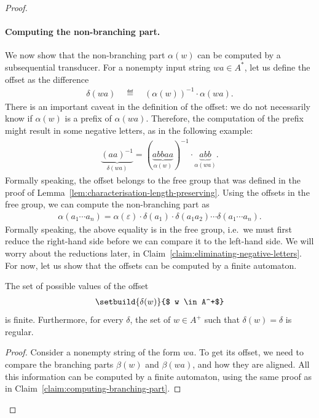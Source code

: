 \begin{proof}
\paragraph*{Computing the non-branching part.} We now show that the non-branching part $\alpha(w)$ can be computed by a subsequential transducer.  For a nonempty input string $wa \in A^*$, let us define the offset as the difference
\begin{align*}
\delta(wa) \quad \eqdef \quad     (\alpha(w))^{-1} \cdot \alpha(wa).
\end{align*}
There is an important caveat in the definition of the offset: we do not  necessarily know if $\alpha(w)$ is a prefix of $\alpha(wa)$. Therefore, the computation of the prefix might result in some negative letters, as in the following example:
\begin{align*}
 \underbrace{(aa)^{-1}}_{\delta(wa)}  = (\underbrace{abbaa}_{\alpha(w)})^{-1} \cdot \underbrace{abb}_{\alpha(wa)}.
\end{align*}
Formally speaking, the offset belongs to the {free group} that was defined in the proof of Lemma~\ref{lem:characterisation-length-preserving}. Using the offsets in the free group, we can compute the non-branching part as 
\begin{align}\label{eq:non-branching-part-deltas}
\alpha(a_1 \cdots a_n) = \alpha(\varepsilon) \cdot \delta(a_1) \cdot \delta(a_1 a_2) \cdots \delta(a_1 \cdots a_n).
\end{align}
Formally speaking, the above equality is in the free group, i.e.~we must first reduce the right-hand side before we can compare it to the left-hand side.
We will worry about the reductions later, in Claim~\ref{claim:eliminating-negative-letters}. For now, let us show that the offsets can be computed by a finite automaton. 

\begin{claim}\label{claim:offsets-are-regular}
The set of possible values of the offset       \begin{align*}
    \setbuild{ \delta(w)}{$ w \in A^+$}
    \end{align*}
    is finite. Furthermore, for every  $\delta$, the set of  $w \in A^+$ such that $\delta(w) = \delta$ is regular.
\end{claim}
\begin{proof}
    Consider a nonempty string of the form $wa$. To get its offset, we need to compare the branching parts $\beta(w)$ and $\beta(wa)$, and how they are aligned. All this information can be computed by a finite automaton, using the same proof as in Claim~\ref{claim:computing-branching-part}.
\end{proof}


\end{proof}

